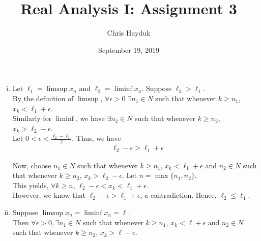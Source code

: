 \documentclass[12pt]{article}
\newenvironment{problem}[2][Problem]{\begin{trivlist}
\item[\hskip \labelsep {\bfseries #1}\hskip \labelsep {\bfseries #2.}]}{\end{trivlist}}
\begin{document}
\title{Real Analysis I: Assignment 3}

\author{Chris Hayduk}
\date{September 19, 2019}

\maketitle

\begin{problem}{1}
\end{problem}

\begin{problem}{2}
\end{problem}

\begin{enumerate}[i)]
	\item Let $\ell_1 = \limsup{x_n}$ and $\ell_2 = \liminf{x_n}$. Suppose $\ell_2 > \ell_1$.\\
	
	By the definition of $\limsup$, $\forall \epsilon > 0 \; \exists n_1 \in N$ such that whenever $k \geq n_1$, $x_k < \ell_1 + \epsilon$.\\
	
	Similarly for $\liminf$, we have $\exists n_2 \in N$ such that whenever $k \geq n_2$, $x_k > \ell_2 - \epsilon$.\\
	
	Let $0 < \epsilon < \frac{\ell_2 - \ell_1}{2}$. Thus, we have
	\begin{align*}
		&\ell_2 - \epsilon > \ell_1 + \epsilon
	\end{align*}
	
	Now, choose $n_1 \in N$ such that whenever $k \geq n_1$, $x_k < \ell_1 + \epsilon$ and $n_2 \in N$ such that whenever $k \geq n_2$, $x_k > \ell_2 - \epsilon$. Let $n = \max{\{n_1, n_2\}}$.\\
	
	This yields, $\forall k \geq n$, $\ell_2 - \epsilon < x_k < \ell_1 + \epsilon$.\\
	
	However, we know that $\ell_2 - \epsilon > \ell_1 + \epsilon$, a contradiction. Hence, $\ell_2 \leq \ell_1$.
	
	\item Suppose $\limsup{x_n} = \liminf{x_n} = \ell$.\\
	
	Then $\forall \epsilon > 0, \exists n_1 \in N$ such that whenever $k \geq n_1$, $x_k < \ell + \epsilon$ and $n_2 \in N$ such that whenever $k \geq n_2$, $x_k > \ell - \epsilon$.\\
	

\end{enumerate}
\end{document}
